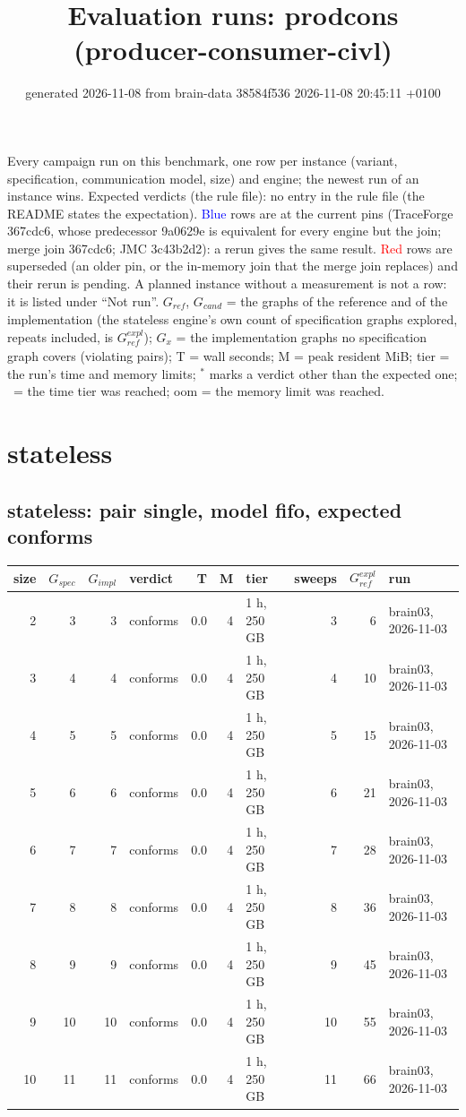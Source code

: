 \documentclass[10pt]{article}
\title{Evaluation runs: \textsf{prodcons} (producer-consumer-civl)}
\author{}
\date{generated 2026-11-08 from brain-data 38584f536 2026-11-08 20:45:11 +0100}
\begin{document}
\maketitle\small
\noindent Every campaign run on this benchmark, one row per instance (variant, specification, communication model, size) and engine; the newest run of an instance wins. Expected verdicts (the rule file): no entry in the rule file (the README states the expectation). \textcolor{blue}{Blue} rows are at the current pins (TraceForge 367cdc6, whose predecessor 9a0629e is equivalent for every engine but the join; merge join 367cdc6; JMC 3c43b2d2): a rerun gives the same result. \textcolor{red}{Red} rows are superseded (an older pin, or the in-memory join that the merge join replaces) and their rerun is pending. A planned instance without a measurement is not a row: it is listed under ``Not run''. $G_{\mathit{ref}}$, $G_{\mathit{cand}}$ = the graphs of the reference and of the implementation (the stateless engine's own count of specification graphs explored, repeats included, is $G_{\mathit{ref}}^{\mathit{expl}}$); $G_x$ = the implementation graphs no specification graph covers (violating pairs); T = wall seconds; M = peak resident MiB; tier = the run's time and memory limits; $^{\ast}$ marks a verdict other than the expected one; \faClock\ = the time tier was reached; oom = the memory limit was reached.

\section*{stateless}
\subsection*{stateless: pair \textsf{single}, model fifo, expected conforms}
\begin{longtable}{@{}rrrlrrlrrl@{}}
\toprule
size & $G_{\mathit{spec}}$ & $G_{\mathit{impl}}$ & verdict & T & M & tier & sweeps & $G_{\mathit{ref}}^{\mathit{expl}}$ & run \\
\midrule
\endhead
\color{blue} 2 & 3 & 3 & conforms & 0.0 & 4 & 1 h, 250 GB & 3 & 6 & brain03, 2026-11-03 \\
\color{blue} 3 & 4 & 4 & conforms & 0.0 & 4 & 1 h, 250 GB & 4 & 10 & brain03, 2026-11-03 \\
\color{blue} 4 & 5 & 5 & conforms & 0.0 & 4 & 1 h, 250 GB & 5 & 15 & brain03, 2026-11-03 \\
\color{blue} 5 & 6 & 6 & conforms & 0.0 & 4 & 1 h, 250 GB & 6 & 21 & brain03, 2026-11-03 \\
\color{blue} 6 & 7 & 7 & conforms & 0.0 & 4 & 1 h, 250 GB & 7 & 28 & brain03, 2026-11-03 \\
\color{blue} 7 & 8 & 8 & conforms & 0.0 & 4 & 1 h, 250 GB & 8 & 36 & brain03, 2026-11-03 \\
\color{blue} 8 & 9 & 9 & conforms & 0.0 & 4 & 1 h, 250 GB & 9 & 45 & brain03, 2026-11-03 \\
\color{blue} 9 & 10 & 10 & conforms & 0.0 & 4 & 1 h, 250 GB & 10 & 55 & brain03, 2026-11-03 \\
\color{blue} 10 & 11 & 11 & conforms & 0.0 & 4 & 1 h, 250 GB & 11 & 66 & brain03, 2026-11-03 \\
\bottomrule
\end{longtable}
\end{document}
